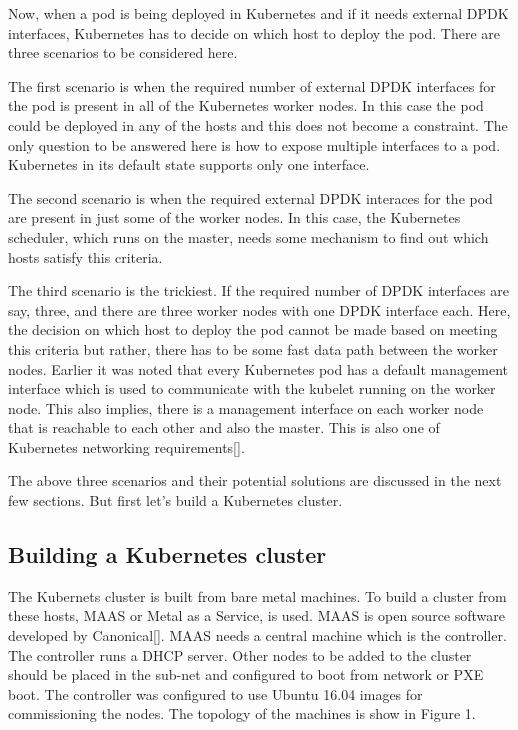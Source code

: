 \documentclass[english, 12pt, a4paper, elec, utf8, a-1b, online]{aaltothesis}
\begin{document}
Now, when a pod is being deployed in Kubernetes and if it needs external DPDK interfaces, Kubernetes has to decide on which host to deploy the pod. There are three scenarios to be considered here.

The first scenario is when the required number of external DPDK interfaces for the pod is present in all of the Kubernetes worker nodes. In this case the pod could be deployed in any of the hosts and this does not become a constraint. The only question to be answered here is how to expose multiple interfaces to a pod. Kubernetes in its default state supports only one interface.

The second scenario is when the required external DPDK interaces for the pod are present in just some of the worker nodes. In this case, the Kubernetes scheduler, which runs on the master, needs some mechanism to find out which hosts satisfy this criteria.

The third scenario is the trickiest. If the required number of DPDK interfaces are say, three, and there are three worker nodes with one DPDK interface each. Here, the decision on which host to deploy the pod cannot be made based on meeting this criteria but rather, there has to be some fast data path between the worker nodes. Earlier it was noted that every Kubernetes pod has a default management interface which is used to communicate with the kubelet running on the worker node. This also implies, there is a management interface on each worker node that is reachable to each other and also the master. This is also one of Kubernetes networking requirements[].

The above three scenarios and their potential solutions are discussed in the next few sections. But first let's build a Kubernetes cluster.

\subsection{Building a Kubernetes cluster}
The Kubernets cluster is built from bare metal machines. To build a cluster from these hosts, MAAS or Metal as a Service, is used. MAAS is open source software developed by Canonical[]. MAAS needs a central machine which is the controller. The controller runs a DHCP server. Other nodes to be added to the cluster should be placed in the sub-net and configured to boot from network or PXE boot. The controller was configured to use Ubuntu 16.04 images for commissioning the nodes. The topology of the machines is show in Figure 1. 
\end{document}
